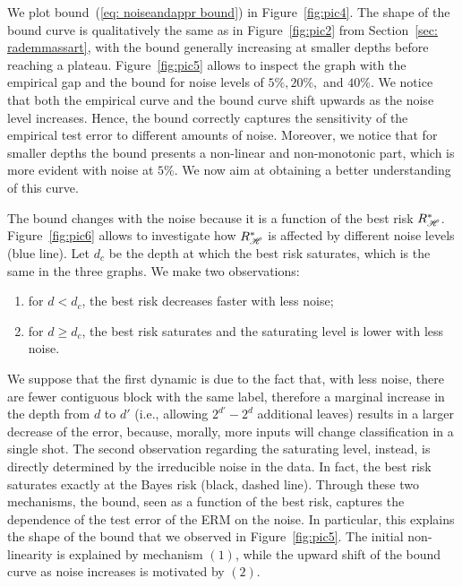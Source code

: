 \documentclass[reqno]{amsart}
\begin{document}
We plot bound~(\ref{eq: noiseandappr bound}) in Figure~\ref{fig:pic4}. The shape of the bound curve is qualitatively the same as in Figure~\ref{fig:pic2} from Section~\ref{sec: rademmassart}, with the bound generally increasing at smaller depths before reaching a plateau. Figure~\ref{fig:pic5} allows to inspect the graph with the empirical gap and the bound for noise levels of $5\%, 20\%,$ and $40\%$. We notice that both the empirical curve and the bound curve shift upwards as the noise level increases. Hence, the bound correctly captures the sensitivity of the empirical test error to different amounts of noise. 
Moreover, we notice that for smaller depths the bound presents a non-linear and non-monotonic part, which is more evident with noise at $5\%$. We now aim at obtaining a better understanding of this curve.

The bound changes with the noise because it is a function of the best risk $R^*_{\mathscr{H}}$. Figure~\ref{fig:pic6} allows to investigate how $R^*_{\mathscr{H}}$ is affected by different noise levels (blue line). Let $d_c$ be the depth at which the best risk saturates, which is the same in the three graphs. We make two observations:
\begin{enumerate}
    \item[(1)] for $d< d_c$, the best risk decreases faster with less noise;
    \item[(2)] for $d\ge d_c$, the best risk saturates and the saturating level is lower with less noise. 
\end{enumerate}
We suppose that the first dynamic is due to the fact that, with less noise, there are fewer contiguous block with the same label, therefore a marginal increase in the depth from $d$ to $d'$ (i.e., allowing $2^{d'}-2^d$ additional leaves) results in a larger decrease of the error, because, morally, more inputs will change classification in a single shot. The second observation regarding the saturating level, instead, is directly determined by the irreducible noise in the data. In fact, the best risk saturates exactly at the Bayes risk (black, dashed line).  
Through these two mechanisms, the bound, seen as a function of the best risk, captures the dependence of the test error of the ERM on the noise. In particular, this explains the shape of the bound that we observed in Figure~\ref{fig:pic5}. The initial non-linearity is explained by mechanism $(1)$, while the upward shift of the bound curve as noise increases is motivated by $(2)$.
\end{document}
